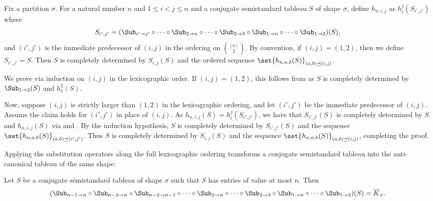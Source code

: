 \documentclass[letterpaper, 11pt]{amsart}
\begin{document}
\begin{lem}\label{lem:sub_lex_injective}
    Fix a partition $\sigma$.
    For a natural number $n$ and $1 \leq i < j \leq n$ and a conjugate semistandard tableau $S$ of shape $\sigma$, define $h_{n, i, j}$ as $h_{i}^{j}(S_{i', j'})$ where
    \[
        S_{i', j'} = (\Sub_{i' \to j'} \circ \cdots \circ \Sub_{2 \to n}\circ\cdots\circ\Sub_{2 \to 3} \circ \Sub_{1 \to n} \circ \cdots \circ \Sub_{1 \to 2})(S),
    \]
    and $(i', j')$ is the immediate predecessor of $(i, j)$ in the ordering on $\binom{[n]}{2}$.
    By convention, if $(i, j) = (1, 2)$, then we define $S_{i', j'} = S$.
    Then $S$ is completely determined by $S_{i, j}(S)$ and the ordered sequence $\set{h_{n, a, b}(S)}_{(a, b) \preceq (i, j)}$. 
\end{lem}
\begin{pf}
    We prove via induction on $(i, j)$ in the lexicographic order.
    If $(i, j) = (1, 2)$, this follows from  as $S$ is completely determined by $\Sub_{1 \to 2}(S)$ and $h_{1}^{2}(S)$.
    
    Now, suppose $(i, j)$ is strictly larger than $(1, 2)$ in the lexicographic ordering, and let $(i', j')$ be the immediate predecessor of $(i, j)$. Assume the claim holds for $(i', j')$ in place of $(i,j)$.
    As $h_{n, i, j}(S) = h_{i}^{j}(S_{i', j'})$, we have that $S_{i', j'}(S)$ is completely determined by $S$ and $h_{n, i, j}(S)$ via  and .
    By the induction hypothesis, $S$ is completely determined by $S_{i', j'}(S)$ and the sequence $\set{h_{n, a, b}(S)}_{(a, b) \preceq (i', j')}$.
    Thus $S$ is completely determined by $S_{i, j}(S)$ and the sequence $\set{h_{n, a, b}(S)}_{(a, b) \preceq (i, j)}$, completing the proof.
\end{pf}

Applying the substitution operators along the full lexicographic ordering transforms a conjugate semistandard tableau into the anti-canonical tableau of the same shape:
\begin{lem}\label{lem:sub_anticanonical}
    Let $S$ be a conjugate semistandard tableau of shape $\sigma$ such that $S$ has entries of value at most $n$.
    Then
    \[
        (\Sub_{n - 1 \to n} \circ \Sub_{n - 2 \to n} \circ  \Sub_{n - 2 \to n-1} \circ \cdots \circ \Sub_{2 \to n}\circ\cdots\circ\Sub_{2 \to 3} \circ \Sub_{1 \to n} \circ \cdots \circ \Sub_{1 \to 2})(S) = \overline{K}_\sigma.
    \]
\end{lem}
\end{document}
